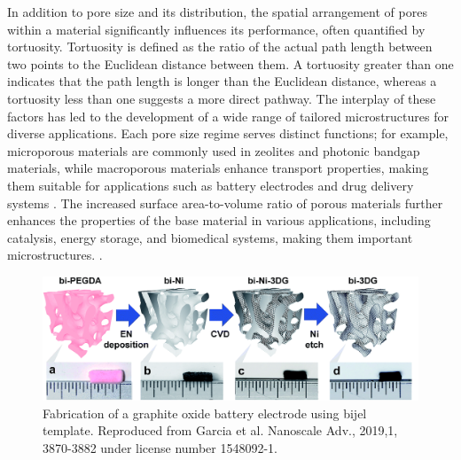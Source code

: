 In addition to pore size and its distribution, the spatial arrangement of pores within a material significantly influences its performance, 
often quantified by tortuosity. Tortuosity is defined as the ratio of the actual path length between two points to the Euclidean distance 
between them. A tortuosity greater than one indicates that the path length is longer than the Euclidean distance, whereas a tortuosity less 
than one suggests a more direct pathway. The interplay of these factors has led to the development of a wide range of tailored microstructures 
for diverse applications. Each pore size regime serves distinct functions; for example, microporous materials are commonly used in zeolites and 
photonic bandgap materials, while macroporous materials enhance transport properties, making them suitable for applications such as battery 
electrodes and drug delivery systems \cite{chen_tortuosity_2020, ebner_tortuosity_2014}. The increased surface area-to-volume ratio of porous 
materials further enhances the properties of the base material in various applications, including catalysis, energy storage, and biomedical 
systems, making them important microstructures. \cite{cha_bicontinuous_2019, samdani_bicontinuous_2017, thorson_bijel-templated_2019, zhao_highly_2014}.  

\begin{figure}
    \centering
    \includegraphics[scale = 0.5]{figures/introduction/bijel_templating.png}
    \caption{Fabrication of a graphite oxide battery electrode using bijel template. Reproduced from Garcia et al. 
             Nanoscale Adv., 2019,1, 3870-3882 under license number 1548092-1. \cite{garcia_scalable_2019}}
    \label{fig:bijel_template}
\end{figure}

